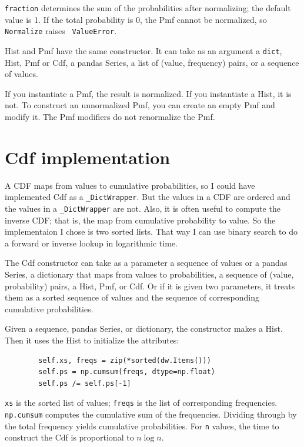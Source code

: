 \documentclass[12pt]{book}
\theoremstyle{exercise}
\begin{document}
{\tt fraction} determines the sum of the probabilities after
normalizing; the default value is 1.  If the total probability is 0,
the Pmf cannot be normalized, so {\tt Normalize} raises {\tt
  ValueError}.

Hist and Pmf have the same constructor.  It can take
as an argument a {\tt dict}, Hist, Pmf or Cdf, a pandas
Series, a list of (value, frequency) pairs, or a sequence of values.%

If you instantiate a Pmf, the result is normalized.  If you
instantiate a Hist, it is not.  To construct an unnormalized Pmf,
you can create an empty Pmf and modify it.  The Pmf modifiers do
not renormalize the Pmf.


\section{Cdf implementation}

A CDF maps from values to cumulative probabilities, so I could have
implemented Cdf as a \verb"_DictWrapper".  But the values in a CDF are
ordered and the values in a \verb"_DictWrapper" are not.  Also, it is
often useful to compute the inverse CDF; that is, the map from
cumulative probability to value.  So the implementaion I chose is two
sorted lists.  That way I can use binary search to do a forward or
inverse lookup in logarithmic time.%
%
%
%
%
%

The Cdf constructor can take as a parameter a sequence of values
or a pandas Series, a dictionary that maps from values to
probabilities, a sequence of (value, probability) pairs, a Hist, Pmf,
or Cdf.  Or if it is given two parameters, it treats them as a sorted
sequence of values and the sequence of corresponding cumulative
probabilities.

Given a sequence, pandas Series, or dictionary, the constructor makes
a Hist.  Then it uses the Hist to initialize the attributes:

\begin{verbatim}
        self.xs, freqs = zip(*sorted(dw.Items()))
        self.ps = np.cumsum(freqs, dtype=np.float)
        self.ps /= self.ps[-1]
\end{verbatim}

{\tt xs} is the sorted list of values; {\tt freqs} is the list
of corresponding frequencies.  {\tt np.cumsum} computes
the cumulative sum of the frequencies.  Dividing through by the
total frequency yields cumulative probabilities.
For {\tt n} values, the time to construct the
Cdf is proportional to $n \log n$.%
\end{document}
